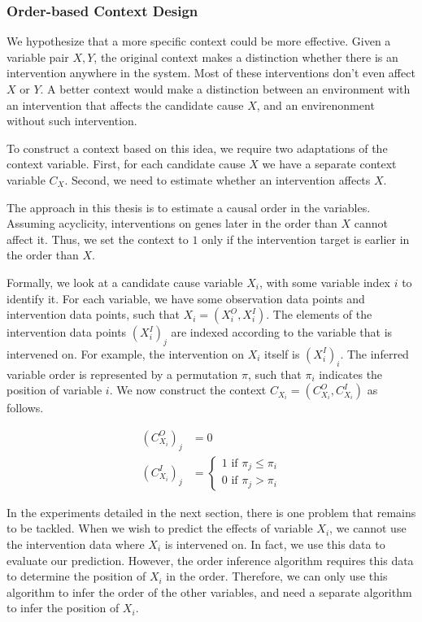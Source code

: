 \subsubsection{Order-based Context Design}

We hypothesize that a more specific context could be more effective. Given a variable pair $X,Y$, the original context makes a distinction whether there is an intervention anywhere in the system. Most of these interventions don't even affect $X$ or $Y$. A better context would make a distinction between an environment with an intervention that affects the candidate cause $X$, and an envirenonment without such intervention. 

To construct a context based on this idea, we require two adaptations of the context variable. First, for each candidate cause $X$ we have a separate context variable $C_X$. Second, we need to estimate whether an intervention affects $X$. 

The approach in this thesis is to estimate a causal order in the variables. Assuming acyclicity, interventions on genes later in the order than $X$ cannot affect it. Thus, we set the context to $1$ only if the intervention target is earlier in the order than $X$. 

Formally, we look at a candidate cause variable $X_i$, with some variable index $i$ to identify it. For each variable, we have some observation data points and intervention data points, such that $X_i = (X^O_i, X^I_i)$. The elements of the intervention data points $(X^I_i)_j$ are indexed according to the variable that is intervened on. For example, the intervention on $X_i$ itself is $(X^I_i)_i$. The inferred variable order is represented by a permutation $\pi$, such that $\pi_i$ indicates the position of variable $i$. We now construct the context $C_{X_i} = (C^O_{X_i}, C^I_{X_i})$ as follows.

$$\begin{array}{ll}
(C^O_{X_i})_j & =0 \\
(C^I_{X_i})_j & = \begin{cases}
    1 \text{ if } \pi_j\leq \pi_i \\
    0 \text{ if } \pi_j> \pi_i    
\end{cases}
\end{array}$$

In the experiments detailed in the next section, there is one problem that remains to be tackled. When we wish to predict the effects of variable $X_i$, we cannot use the intervention data where $X_i$ is intervened on. In fact, we use this data to evaluate our prediction. However, the order inference algorithm requires this data to determine the position of $X_i$ in the order. Therefore, we can only use this algorithm to infer the order of the other variables, and need a separate algorithm to infer the position of $X_i$.

